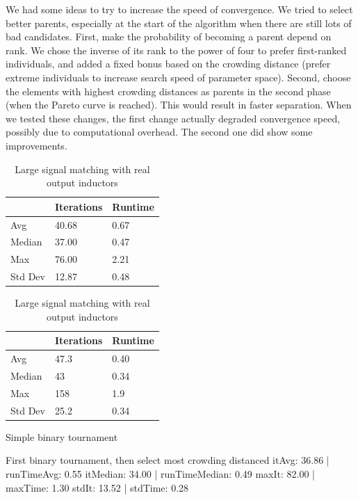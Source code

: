 We had some ideas to try to increase the speed of convergence. We tried to select better parents, especially at the start of the algorithm when there are still lots of bad candidates.
First, make the probability of becoming a parent depend on rank. We chose the inverse of its rank to the power of four to prefer first-ranked individuals, and added a fixed bonus based on the crowding distance (prefer extreme individuals to increase search speed of parameter space).
Second, choose the elements with highest crowding distances as parents in the second phase (when the Pareto curve is reached). This would result in faster separation.
When we tested these changes, the first change actually degraded  convergence speed, possibly due to computational overhead. The second one did show some improvements.
\begin{table}[!htb]
	\caption{Summarizing table}
	\begin{minipage}{.5\linewidth}
		\caption{Large signal matching with real output inductors}
		\centering
		\begin{tabular}{ | l | l | l | }
			\hline
		 	 & Iterations & Runtime \\
		 	 \hline
			Avg &40.68	 &  0.67  \\
			Median &37.00 &  0.47\\
			Max &76.00	& 2.21 \\
			Std Dev & 12.87	&  0.48 \\
			\hline
		\end{tabular}
	\end{minipage}%
	\begin{minipage}{.5\linewidth}
		\centering
		\caption{Large signal matching with real output inductors}
		\begin{tabular}{ |l| l | l |}
			\hline
			& Iterations & Runtime \\
			\hline
			Avg    &      47.3   &   0.40 \\
			Median      &     43      &      0.34    \\
			Max		&	 158      &     1.9  \\
			Std Dev  &   25.2   &   0.34   \\
			\hline
		\end{tabular}
	\end{minipage} 
\end{table}


Simple binary tournament


First binary tournament, then select most crowding distanced
itAvg: 36.86|	 runTimeAvg:  0.55
itMedian: 34.00	|	 runTimeMedian:  0.49
maxIt: 82.00	|	 maxTime:  1.30 
stdIt: 13.52	|	 stdTime:  0.28 

